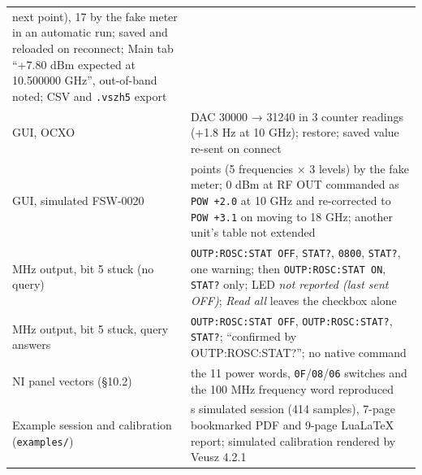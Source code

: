\documentclass[
\directlua{luaotfload.add_fallback("qsfallback", {"DejaVu Sans:mode=harf;", "DejaVu Sans Mono:mode=harf;", "DejaVu Math TeX Gyre:mode=harf;"})}
  10pt,
  letterpaper,
]{article}
\begin{document}
\begin{longtable}[]{@{}
  >{\raggedright\arraybackslash}p{}
  >{\raggedright\arraybackslash}p{}@{}}
next point), 17 by the fake meter in an automatic run; saved and
reloaded on reconnect; Main tab ``+7.80 dBm expected at 10.500000 GHz'',
out-of-band noted; CSV and \texttt{.vszh5} export \\
GUI, OCXO & DAC 30000 → 31240 in 3 counter readings (+1.8 Hz at 10 GHz);
restore; saved value re-sent on connect \\
GUI, simulated FSW-0020 & 15 points (5 frequencies × 3 levels) by the
fake meter; 0 dBm at RF OUT commanded as \texttt{POW\ +2.0} at 10 GHz
and re-corrected to \texttt{POW\ +3.1} on moving to 18 GHz; another
unit's table not extended \\
10 MHz output, bit 5 stuck (no query) & \texttt{OUTP:ROSC:STAT\ OFF},
\texttt{STAT?}, \texttt{0800}, \texttt{STAT?}, one warning; then
\texttt{OUTP:ROSC:STAT\ ON}, \texttt{STAT?} only; LED \emph{not reported
(last sent OFF)}; \emph{Read all} leaves the checkbox alone \\
10 MHz output, bit 5 stuck, query answers &
\texttt{OUTP:ROSC:STAT\ OFF}, \texttt{OUTP:ROSC:STAT?}, \texttt{STAT?};
``confirmed by OUTP:ROSC:STAT?''; no native command \\
NI panel vectors (§10.2) & the 11 power words,
\texttt{0F}/\texttt{08}/\texttt{06} switches and the 100 MHz frequency
word reproduced \\
Example session and calibration (\texttt{examples/}) & 41 s simulated
session (414 samples), 7-page bookmarked PDF and 9-page LuaLaTeX report;
simulated calibration rendered by Veusz 4.2.1 \\
\end{longtable}
\end{document}
